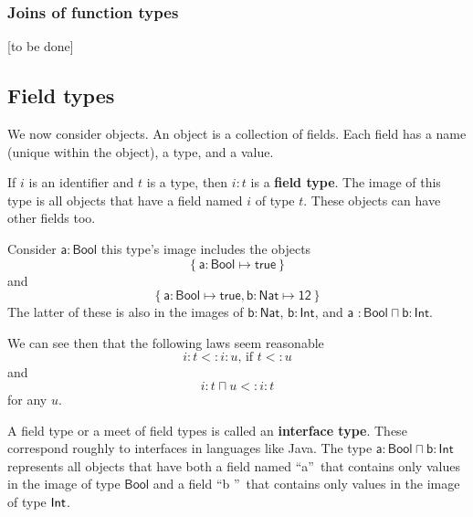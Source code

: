 \documentclass[12pt]{article}
\begin{document}
\subsubsection{Joins of function types}

[to be done]

\subsection{Field types}

We now consider objects. An object is a collection of fields. Each field has
a name (unique within the object), a type, and a value.

If $i$ is an identifier and $t$ is a type, then $i\colon t$ is a \textbf{%
field type}. The image of this type is all objects that have a field named $%
i $ of type $t$. These objects can have other fields too.

Consider $\mathsf{a\colon Bool}$ this type's image includes the objects%
\begin{equation*}
\left\{ \mathsf{a\colon Bool}\mapsto \mathsf{true}\right\} 
\end{equation*}%
and%
\begin{equation*}
\left\{ \mathsf{a\mathsf{\colon Bool}\mapsto true},\mathsf{b\mathsf{\colon }%
Nat\mapsto 12}\right\} 
\end{equation*}%
The latter of these is also in the images of $\mathsf{b}$\textsf{$\colon $}$%
\mathsf{Nat}$, $\mathsf{b}$\textsf{$\colon $}$\mathsf{Int}$, and $\mathsf{a}$%
\textsf{$\colon $}$\mathsf{Bool\sqcap b}$\textsf{$\colon $}$\mathsf{Int}$.

We can see then that the following laws seem reasonable 
\begin{equation*}
i\colon t<:i\colon u\text{, if }t<:u
\end{equation*}%
and 
\begin{equation*}
i\colon t\sqcap u<:i\colon t
\end{equation*}%
for any $u$.

A field type or a meet of field types is called an \textbf{interface type}.
These correspond roughly to interfaces in languages like Java. The type $%
\mathsf{a}$\textsf{$\colon $}$\mathsf{Bool\sqcap b}$\textsf{$\colon $}$%
\mathsf{Int}$ represents all objects that have both a field named
\textquotedblleft \textsf{a}\textquotedblright\ that contains only values in
the image of type $\mathsf{Bool}$ and a field \textquotedblleft \textsf{b}%
\textquotedblright\ that contains only values in the image of type $\mathsf{%
Int}$.
\end{document}
